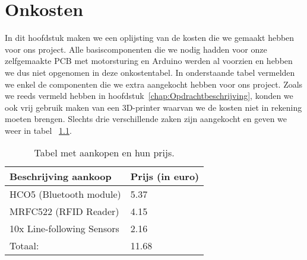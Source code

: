 \chapter{Onkosten}
In dit hoofdstuk maken we een oplijsting van de kosten die we gemaakt hebben voor ons project.  Alle basiscomponenten die we nodig hadden voor onze zelfgemaakte PCB met motorsturing en Arduino werden al voorzien en hebben we dus niet opgenomen in deze onkostentabel. In onderstaande tabel vermelden we enkel de componenten die we extra aangekocht hebben voor ons project. Zoals we reeds vermeld hebben in hoofdstuk~\ref{chap:Opdrachtbeschrijving}, konden we ook vrij gebruik maken van een 3D-printer waarvan we de kosten niet in rekening moeten brengen. Slechts drie verschillende zaken zijn aangekocht en geven we weer in tabel ~\ref{table:Onkosten}.\\
\begin {table}[H]
\caption {Tabel met aankopen en hun prijs.} \label{table:Onkosten}
\begin{center}
	\begin{tabular}{ | l | l | }
	\hline
	Beschrijving aankoop & Prijs (in euro) \\ \hline
	\hline
	HCO5 (Bluetooth module) & 5.37 \\ \hline
	MRFC522 (RFID Reader) & 4.15 \\ \hline
	10x Line-following Sensors & 2.16 \\ \hline \hline
	Totaal: & 11.68 \\ \hline
	\end{tabular}
\end{center}
\end{table}
